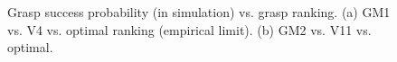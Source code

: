 \begin{figure}[t]
\centering
{}

  \caption{Grasp success probability (in simulation) vs. grasp ranking. (a) GM1 vs. V4 vs. optimal ranking (empirical limit). (b) GM2 vs. V11 vs. optimal.}
  \label{fig:successvsranking}
\end{figure}



